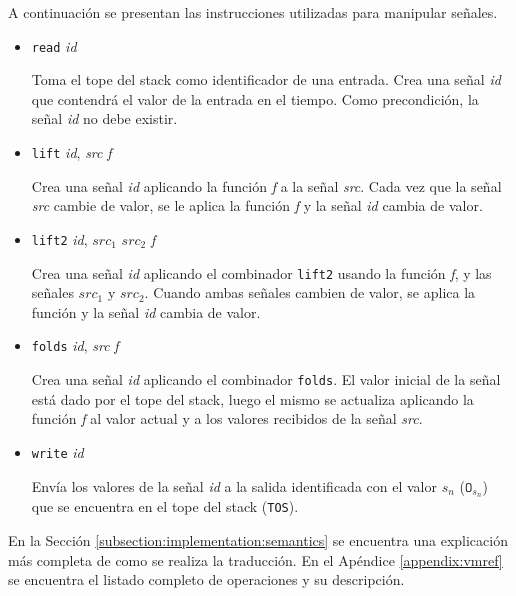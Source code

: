  A continuación se presentan las instrucciones utilizadas para manipular
señales.
  \begin{itemize}

\item {
    \texttt{read} \textit{id}

      Toma el tope del stack como identificador de una entrada.
      Crea una señal \textit{id} que contendrá el valor de la entrada
    en el tiempo.
      Como precondición, la señal \textit{id} no debe existir.

    
}
\item {
    \texttt{lift} \textit{id}, \textit{src} \textit{f}

      Crea una señal \textit{id} aplicando la función \textit{f}
    a la señal \textit{src}.
      Cada vez que la señal \textit{src} cambie de valor, se le aplica
      la función \textit{f} y la señal \textit{id} cambia de valor.
  
    
}
\item {
  \texttt{lift2} \textit{id}, $\textit{src}_1$ $\textit{src}_2$ \textit{f}

      Crea una señal \textit{id} aplicando el combinador \texttt{lift2}
    usando la función \textit{f}, y las señales $\textit{src}_1$ y
  $\textit{src}_2$.
      Cuando ambas señales cambien de valor, se aplica la función
      y la señal \textit{id} cambia de valor.

    
}
\item {
    \texttt{folds} \textit{id}, \textit{src} \textit{f}

      Crea una señal \textit{id} aplicando el combinador \texttt{folds}.
    El valor inicial de la señal está dado por el tope del stack, luego
    el mismo se actualiza aplicando la función \textit{f} al valor actual
    y a los valores recibidos de la señal \textit{src}.

    
}
\item {
    \texttt{write} \textit{id}

    Envía los valores de la señal \textit{id} a la salida identificada
    con el valor $s_n$ ($\texttt{O}_{s_n}$) que se encuentra en el
    tope del stack (\texttt{TOS}).
    
    
}
\end{itemize}

  En la Sección \ref{subsection:implementation:semantics} se encuentra
una explicación más completa de como se realiza la traducción.
  En el Apéndice \ref{appendix:vmref} se encuentra el listado completo
  de operaciones y su descripción.

